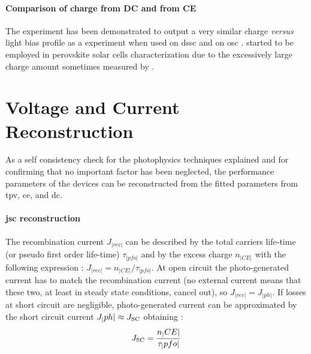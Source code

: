 	\paragraph{Comparison of charge from DC and from CE}
	The  experiment has been demonstrated to output a very similar charge \textit{versus} light bias profile as a  experiment when used on \gls{dssc} \cite{ORegan2005,Barnes2013} and on \gls{osc} \cite{Shuttle2008a}.
	 started to be employed in perovskite solar cells characterization due to the excessively large charge amount sometimes measured by  \cite{Wheeler2017,ORegan2015b}.

\section{Voltage and Current Reconstruction}
As a self consistency check for the photophysics techniques explained and for confirming that no important factor has been neglected, the performance parameters of the devices can be reconstructed from the fitted parameters from \gls{tpv}, \gls{ce}, and \gls{dc}.

\paragraph{\Gls{jsc} reconstruction}
The recombination current $J_|rec|$ can be described by the total carriers life-time (or pseudo first order life-time) $\tau_|pfo|$ and by the excess charge $n_|CE|$ with the following expression \cite{Wheeler2017,Du2018}: $J_|rec| = n_|CE| / \tau_|pfo|$.
At open circuit the photo-generated current has to match the recombination current (no external current means that these two, at least in steady state conditions, cancel out), so $J_|rec| = J_|ph|$.
If losses at short circuit are negligible, photo-generated current can be approximated by the short circuit current $J_|ph| \approx J_\mathrm{SC}$ obtaining \cite{ORegan2015b}:
\begin{equation}\label{eq:reconstruction_jsc}
J_\mathrm{SC} = \frac{n_|CE|}{\tau_|pfo|}
\end{equation}

